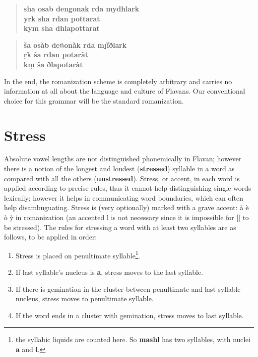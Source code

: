\documentclass[10pt,oneside]{memoir}
\newcommand{\apa}[1]{[\textipa{#1}]}
\begin{document}
\begin{verse}\textbf{sha osab dengonak rda mydhlark\\yrk sha rdan pottarat\\kym sha dhlapottarat}\end{verse}

\begin{verse}\textbf{\v{s}a osàb de\~nonàk rda m{\j}ȉðlark\\\d{r}k \v{s}a rdan po\=taràt\\k\d{m} \v{s}a ðlapo\=taràt}\end{verse}


In the end, the romanization scheme is completely arbitrary and carries no information at all about the language and culture of Flavans. Our conventional choice for this grammar will be the standard romanization.

\section{Stress}

Absolute vowel lengths are not distinguished phonemically in Flavan; however there is a notion of the longest and loudest (\textbf{stressed}) syllable in a word as compared with all the others (\textbf{unstressed}). Stress, or accent, in each word is applied according to precise rules, thus it cannot help distinguishing single words lexically; however it helps in communicating word boundaries, which can often help disambuguating. Stress is (very optionally) marked with a grave accent: \`a \`e \`o \`y in romanization (an accented l is not necessary since it is impossible for \apa{\s{l}} to be stressed). The rules for stressing a word with at least two syllables are as follows, to be applied in order:

\begin{enumerate}
	\item Stress is placed on penultimate syllable\footnote{the syllabic liquids are counted here. So \textbf{mashl} has two syllables, with nuclei \textbf{a} and \textbf{l}.}.
	\item If last syllable's nucleus is \textbf{a}, stress moves to the last syllable.
	\item If there is gemination in the cluster between penultimate and last syllable nucleus, stress moves to penultimate syllable.
	\item If the word ends in a cluster with gemination, stress moves to last syllable.
\end{enumerate}
\end{document}
